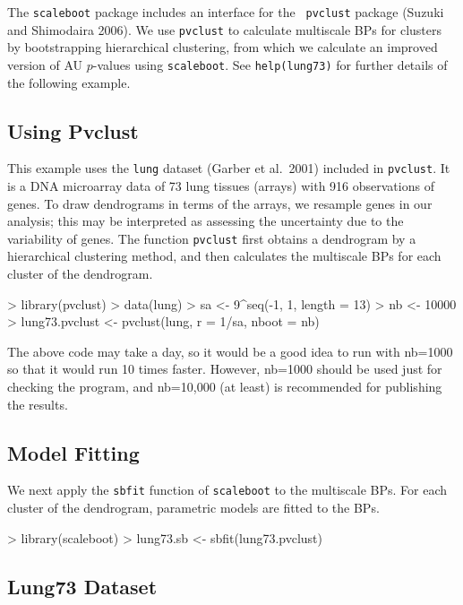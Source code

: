 \documentclass[a4paper]{amsart}
\begin{document}
The {\tt scaleboot} package includes an interface for the {\tt
pvclust} package (Suzuki and Shimodaira 2006).  We use {\tt pvclust}
to calculate multiscale BPs for clusters by bootstrapping hierarchical
clustering, from which we calculate an improved version of AU
$p$-values using {\tt scaleboot}. See {\tt help(lung73)} for further
details of the following example.

\subsection{Using Pvclust}

This example uses the {\tt lung} dataset (Garber et al.~2001) included
in {\tt pvclust}.  It is a DNA microarray data of 73 lung tissues
(arrays) with 916 observations of genes.  To draw dendrograms in terms
of the arrays, we resample genes in our analysis; this may be
interpreted as assessing the uncertainty due to the variability of
genes.  The function {\tt pvclust} first obtains a dendrogram by a
hierarchical clustering method, and then calculates the multiscale BPs
for each cluster of the dendrogram.
\begin{Schunk}
\begin{Sinput}
> library(pvclust)
> data(lung)
> sa <- 9^seq(-1, 1, length = 13)
> nb <- 10000
> lung73.pvclust <- pvclust(lung, r = 1/sa, nboot = nb)
\end{Sinput}
\end{Schunk}
The above code may take a day, so it would be a good idea to run
with nb=1000 so that it would run 10 times faster. However, nb=1000
should be used just for checking the program, and nb=10,000 (at least)
is recommended for publishing the results.

\subsection{Model Fitting}

We next apply the {\tt sbfit} function of {\tt scaleboot} to the
multiscale BPs. For each cluster of the dendrogram, parametric models
are fitted to the BPs.
\begin{Schunk}
\begin{Sinput}
> library(scaleboot)
> lung73.sb <- sbfit(lung73.pvclust)
\end{Sinput}
\end{Schunk}

\subsection{Lung73 Dataset}
\end{document}
